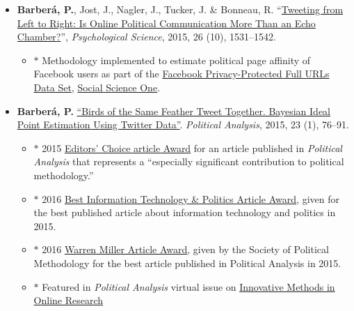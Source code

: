\documentclass[margin,line,11pt]{resume}
\begin{document}
\begin{resume}
\begin{itemize}[leftmargin=5.5mm]
\item[8.] \textbf{Barber\'{a}, P.}, Jost, J., Nagler, J., Tucker, J. \& Bonneau, R. ``\href{http://pss.sagepub.com/content/early/2015/08/21/0956797615594620}{Tweeting from Left to Right: Is Online Political Communication More Than an Echo Chamber?}'', \textit{Psychological Science}, 2015, 26 (10), 1531--1542.
\begin{itemize}
\item[] $\ast$ Methodology implemented to estimate political page affinity of Facebook users as part of the \href{https://socialscience.one/files/partnershipone/files/urls-v2_1.pdf}{Facebook Privacy-Protected Full URLs Data Set}, \href{https://socialscience.one/}{Social Science One}.
\end{itemize}

\item[7.] \textbf{Barber\'{a}, P.} \href{http://pan.oxfordjournals.org/cgi/reprint/mpu011?ijkey=uMFPw4dsMHM7608&keytype=ref}{``Birds of the Same Feather Tweet Together. Bayesian Ideal Point Estimation Using Twitter Data''}. \emph{Political Analysis}, 2015, 23 (1), 76--91.
\begin{itemize}
\item[] $\ast$ 2015 \href{http://oxfordjournals.org/our_journals/polana/editorschoice.html}{Editors' Choice article Award} for an article published in \textit{Political Analysis} that represents a ``especially significant contribution to political methodology.''
\vspace{-.1cm}
\item[] $\ast$ 2016 \href{http://www.apsanet.org/section-18-best-information-technology-and-politicsp-award}{Best Information Technology \& Politics Article Award}, given for the best published article about information technology and politics in 2015.
\vspace{-.1cm}
\item[] $\ast$ 2016 \href{http://www.oxfordjournals.org/our_journals/polana/awards_warrenmiller.html}{Warren Miller Article Award}, given by the Society of Political Methodology for the best article published in Political Analysis in 2015.
\vspace{-.1cm}
\item[] $\ast$ Featured in \textit{Political Analysis} virtual issue on \href{https://www.cambridge.org/core/journals/political-analysis/issue/online-research-methods/FF4E7D31B561F7FC794AF5894A53E9F3}{Innovative Methods in Online Research}
\end{itemize}


\end{itemize}
\end{resume}
\end{document}
